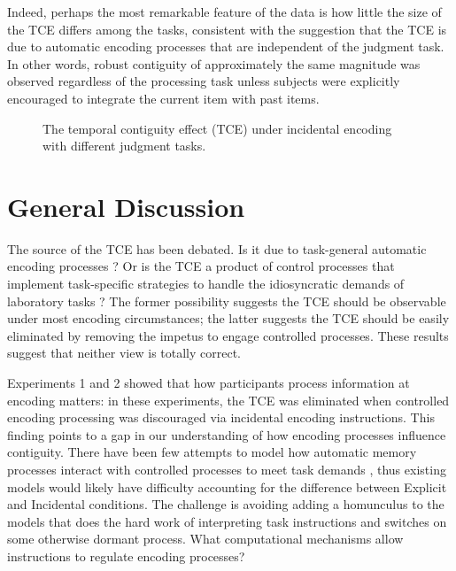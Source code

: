 \documentclass[man,natbib,floatsintext]{apa6} %
\begin{document}
Indeed, perhaps the most remarkable feature of the data is how little the size of the TCE differs among the tasks, consistent with the suggestion that the TCE is due to automatic encoding processes that are independent of the judgment task. %
In other words, robust contiguity of approximately the same magnitude was observed regardless of the processing task unless subjects were explicitly encouraged to integrate the current item with past items.

\begin{figure}%
\caption{The temporal contiguity effect (TCE) under incidental encoding with different judgment tasks. \paneltext}
\label{E3}
\end{figure}

\section{General Discussion}
The source of the TCE has been debated. Is it due to task-general automatic encoding processes \citep{HealEtal14}? Or is the TCE a product of control processes that implement task-specific strategies to handle the idiosyncratic demands of laboratory tasks \citep{Hint16}? The former possibility suggests the TCE should be observable under most encoding circumstances; the latter suggests the TCE should be easily eliminated by removing the impetus to engage controlled processes. These results suggest that neither view is totally correct.

Experiments 1 and 2 showed that how participants process information at encoding matters: in these experiments, the TCE was eliminated when controlled encoding processing was discouraged via incidental encoding instructions. This finding points to a gap in our understanding of how encoding processes influence contiguity. There have been few attempts to model how automatic memory processes interact with controlled processes to meet task demands \citep{LehmMalm13,PolyEtal09}, thus existing models would likely have difficulty accounting for the difference between Explicit and Incidental conditions. The challenge is avoiding adding a homunculus to the models that does the hard work of interpreting task instructions and switches on some otherwise dormant process. What computational mechanisms allow instructions to regulate encoding processes?
\end{document}
